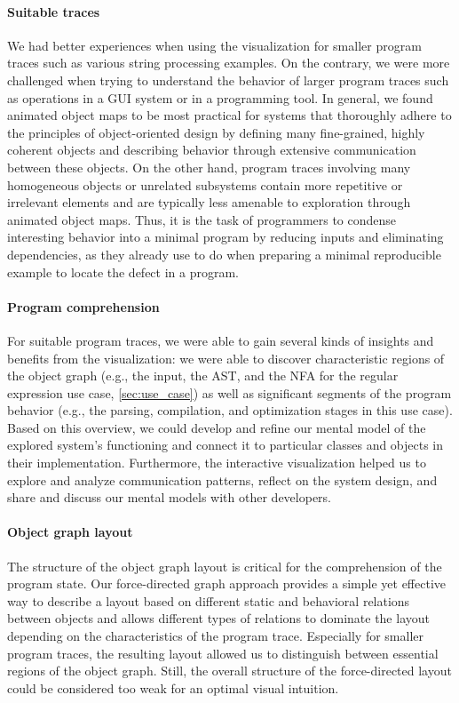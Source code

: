\paragraph{Suitable traces}

We had better experiences when using the visualization for smaller program traces such as various string processing examples.
On the contrary, we were more challenged when trying to understand the behavior of larger program traces such as operations in a GUI system or in a programming tool.
In general, we found animated object maps to be most practical for systems that thoroughly adhere to the principles of object-oriented design by defining many fine-grained, highly coherent objects and describing behavior through extensive communication between these objects.
On the other hand, program traces involving many homogeneous objects or unrelated subsystems contain more repetitive or irrelevant elements and are typically less amenable to exploration through animated object maps.
Thus, it is the task of programmers to condense interesting behavior into a minimal program by reducing inputs and eliminating dependencies, as they already use to do when preparing a minimal reproducible example to locate the defect in a program.

\paragraph{Program comprehension}

For suitable program traces, we were able to gain several kinds of insights and benefits from the visualization:
we were able to discover characteristic regions of the object graph (e.g., the input, the AST, and the NFA for the regular expression use case, \cref{sec:use_case}) as well as significant segments of the program behavior (e.g., the parsing, compilation, and optimization stages in this use case).
Based on this overview, we could develop and refine our mental model of the explored system's functioning and connect it to particular classes and objects in their implementation.
Furthermore, the interactive visualization helped us to explore and analyze communication patterns, reflect on the system design, and share and discuss our mental models with other developers.

\paragraph{Object graph layout}

The structure of the object graph layout is critical for the comprehension of the program state.
Our force-directed graph approach provides a simple yet effective way to describe a layout based on different static and behavioral relations between objects and allows different types of relations to dominate the layout depending on the characteristics of the program trace.
Especially for smaller program traces, the resulting layout allowed us to distinguish between essential regions of the object graph.
Still, the overall structure of the force-directed layout could be considered too weak for an optimal visual intuition.

